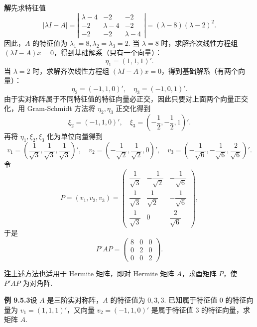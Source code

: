 \documentclass[UTF8, 12pt, fontset=fandol, oneside]{ctexart}
\begin{document}
\noindent\textbf{解}\quad 先求特征值
\[
  |\lambda I-A|=
  \left|\begin{array}{ccc}
    \lambda-4 & -2 & -2\\
    -2 & \lambda-4 & -2\\
    -2 & -2 & \lambda-4
  \end{array}\right|
  =(\lambda-8)(\lambda-2)^2.
\]
因此，$A$ 的特征值为 $\lambda_1=8,\lambda_2=\lambda_3=2$. 当 $\lambda=8$ 时，求解齐次线性方程组 $(\lambda I-A)x=0$，得到基础解系（只有一个向量）：
\[
  \eta_1=(1,1,1)'.
\]
当 $\lambda=2$ 时，求解齐次线性方程组 $(\lambda I-A)x=0$，得到基础解系（有两个向量）：
\[
  \eta_2=(-1,1,0)',\quad \eta_3=(-1,0,1)'.
\]
由于实对称阵属于不同特征值的特征向量必正交，因此只要对上面两个向量正交化，用 Gram-Schmidt 方法将 $\eta_2,\eta_3$ 正交化得到
\[
  \xi_2=(-1,1,0)',\quad \xi_3=\left(-\frac12,-\frac12,1\right)'.
\]
再将 $\eta_1,\xi_2,\xi_3$ 化为单位向量得到
\[
  v_1=\left(\frac1{\sqrt3},\frac1{\sqrt3},\frac1{\sqrt3}\right)',\quad
  v_2=\left(-\frac1{\sqrt2},\frac1{\sqrt2},0\right)',\quad
  v_3=\left(-\frac1{\sqrt6},-\frac1{\sqrt6},\frac2{\sqrt6}\right)'.
\]
令
\[
  P=(v_1,v_2,v_3)=
  \left(\begin{array}{ccc}
    \dfrac1{\sqrt3} & -\dfrac1{\sqrt2} & -\dfrac1{\sqrt6}\\
    \dfrac1{\sqrt3} & \dfrac1{\sqrt2} & -\dfrac1{\sqrt6}\\
    \dfrac1{\sqrt3} & 0 & \dfrac2{\sqrt6}
  \end{array}\right),
\]
于是
\[
  P'AP=
  \left(\begin{array}{ccc}
    8 & 0 & 0\\
    0 & 2 & 0\\
    0 & 0 & 2
  \end{array}\right).
\]

\noindent\textbf{注}\quad 上述方法也适用于 Hermite 矩阵，即对 Hermite 矩阵 $A$，求酉矩阵 $P$，使 $\overline P'AP$ 为对角阵.

\noindent\textbf{例 9.5.3}\quad 设 $A$ 是三阶实对称阵，$A$ 的特征值为 $0,3,3$. 已知属于特征值 $0$ 的特征向量为 $v_1=(1,1,1)'$，又向量 $v_2=(-1,1,0)'$ 是属于特征值 $3$ 的特征向量，求矩阵 $A$.
\end{document}
